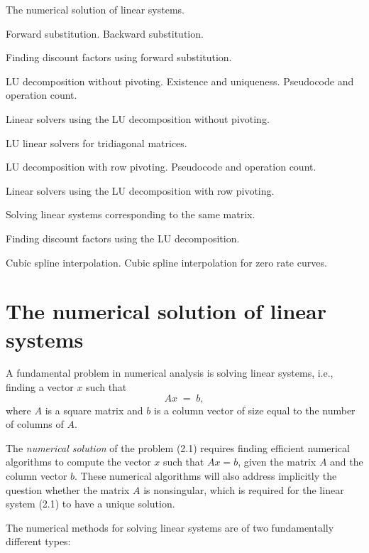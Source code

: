 
\noindent The numerical solution of linear systems.
\medskip

\noindent Forward substitution. Backward substitution.
\medskip

\noindent Finding discount factors using forward substitution.
\medskip

\noindent LU decomposition without pivoting. Existence and uniqueness. Pseudocode and
operation count.
\medskip

\noindent Linear solvers using the LU decomposition without pivoting.
\medskip

\noindent LU linear solvers for tridiagonal matrices.
\medskip

\noindent LU decomposition with row pivoting. Pseudocode and operation count.
\medskip

\noindent Linear solvers using the LU decomposition with row pivoting.
\medskip

\noindent Solving linear systems corresponding to the same matrix.
\medskip

\noindent Finding discount factors using the LU decomposition.
\medskip

\noindent Cubic spline interpolation. Cubic spline interpolation for zero rate curves.
\medskip

\section{The numerical solution of linear systems}

A fundamental problem in numerical analysis is solving linear systems, i.e., finding
a vector $x$ such that
\begin{equation}
Ax \;=\; b,
\end{equation}
where $A$ is a square matrix and $b$ is a column vector of size equal to the number of
columns of $A$.

The \textit{numerical solution} of the problem (2.1) requires finding efficient
numerical algorithms to compute the vector $x$ such that $Ax = b$, given the matrix $A$
and the column vector $b$. These numerical algorithms will also address implicitly the
question whether the matrix $A$ is nonsingular, which is required for the linear system
(2.1) to have a unique solution.

The numerical methods for solving linear systems are of two fundamentally different
types:

